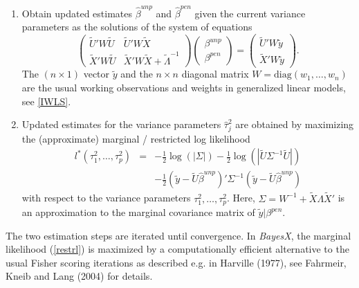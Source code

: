 \documentclass[11pt,a4paper,twoside]{bayesxarticle}
\newcommand{\diag}{\mbox{diag}}
\begin{document}
\begin{enumerate}
\item Obtain updated estimates $\hat{\beta}^{unp}$ and $\hat{\beta}^{pen}$ given the current variance parameters
as the solutions of the system of equations
\begin{equation}
\label{equsystem} \left(
\begin{array}{ll}
\tilde{U}' W  \tilde{U} & \tilde{U}' W  \tilde{X} \\
\tilde{X}' W  \tilde{U} & \tilde{X}' W  \tilde{X} +
\tilde{\Lambda}^{-1}
\end{array}
\right) \left(
\begin{array}{l}
\beta^{unp} \\
\beta^{pen}
\end{array}
\right) = \left(
\begin{array}{l}
\tilde{U}'W \tilde{y} \\
\tilde{X}'W \tilde{y}
\end{array}
\right).
\end{equation}
The $(n \times 1)$ vector $\tilde{y}$ and the $n \times n$ diagonal
matrix $W = \diag(w_1,\dots,w_n)$ are the usual working observations
and weights in generalized linear models, see \autoref{IWLS}.
\item Updated estimates for the variance parameters $\hat{\tau}_j^2$ are obtained by maximizing
the (approximate) marginal / restricted log likelihood
\begin{equation}
\label{restrl}
\begin{array}{lll}
l^{\ast}(\tau^2_1,\dots,\tau^2_p) & = & -\frac{1}{2}
\log(|\Sigma|) - \frac{1}{2} \log(|\tilde{U} \Sigma^{-1}
\tilde{U}|) \\ [0.3cm] & & - \frac{1}{2} (\tilde{y} - \tilde{U}
\hat{\beta}^{unp})' \Sigma^{-1} (\tilde{y} - \tilde{U}
\hat{\beta}^{unp})
\end{array}
\end{equation}
with respect to the variance parameters $\tau^2_1,\dots,\tau^2_p$.
Here, $\Sigma = W^{-1} + \tilde{X} \Lambda \tilde{X}'$ is an
approximation to the marginal covariance matrix of $\tilde{y} |
\beta^{pen}$.
\end{enumerate}

The two estimation steps are iterated until convergence. In {\em
BayesX}, the marginal likelihood (\ref{restrl}) is maximized by a
computationally efficient alternative to the usual Fisher scoring
iterations as described e.g. in Harville (1977), see Fahrmeir, Kneib
and Lang (2004) for details.
\end{document}
